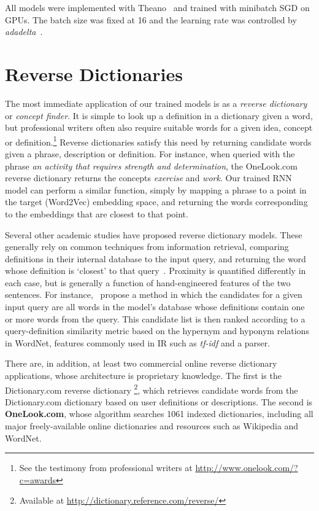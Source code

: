 All models were implemented with Theano~\cite{bergstra+al:2010-scipy} and trained with minibatch SGD on GPUs. The batch size was fixed at 16 and the learning rate was controlled by \emph{adadelta}~\cite{zeiler2012adadelta}. %

\section{Reverse Dictionaries}

The most immediate application of our trained models is as a \emph{reverse dictionary} or \emph{concept finder}. It is simple to look up a definition in a dictionary given a word, but professional writers often also require suitable words for a given idea, concept or definition.\footnote{See the testimony from professional writers at \url{http://www.onelook.com/?c=awards}} Reverse dictionaries satisfy this need by returning candidate words given a phrase, description or definition. For instance, when queried with the phrase \emph{an activity that requires strength and determination}, the OneLook.com reverse dictionary returns the concepts \emph{exercise} and \emph{work}. Our trained RNN model can perform a similar function, simply by mapping a phrase to a point in the target (Word2Vec) embedding space, and returning the words corresponding to the embeddings that are closest to that point.  

Several other academic studies have proposed reverse dictionary models. These generally rely on common techniques from information retrieval, comparing definitions in their internal database to the input query, and returning the word whose definition is `closest' to that query~\cite{bilac2003improving,bilac2004dictionary,zock2004word}. Proximity is quantified differently in each case, but is generally a function of hand-engineered features of the two sentences. For instance,~\cite{shaw2013building} propose a method in which the candidates for a given input query are all words in the model's database whose definitions contain one or more words from the query. This candidate list is then ranked according to a query-definition similarity metric based on the hypernym and hyponym relations in WordNet, features commonly used in IR such as \emph{tf-idf} and a parser. 

There are, in addition, at least two commercial online reverse dictionary applications, whose architecture is proprietary knowledge. The first is the Dictionary.com reverse dictionary \footnote{Available at \url{http://dictionary.reference.com/reverse/}}, which retrieves candidate words from the Dictionary.com dictionary based on user definitions or descriptions. The second is {\bf OneLook.com}, whose algorithm searches 1061 indexed dictionaries, including all major freely-available online dictionaries and resources such as Wikipedia and WordNet.

